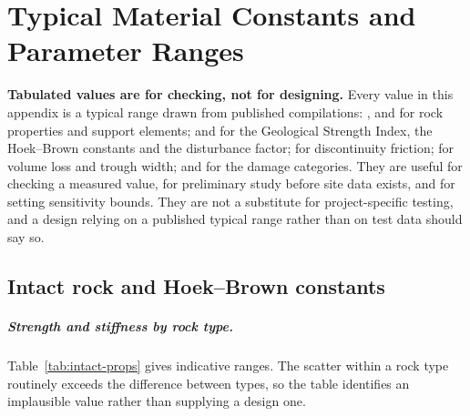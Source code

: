 \chapter{Typical Material Constants and Parameter Ranges}
\label{app:constants}

\noindent\textbf{Tabulated values are for checking, not for designing.}\enspace
Every value in this appendix is a typical range drawn from published
compilations: \citet{hoekbrown1980underground}, \citet{bradybrown2006rock}
and \citet{hoek1995support} for rock properties and support elements;
\citet{marinos2000gsi} and \citet{hoek2002hb} for the Geological Strength
Index, the Hoek--Brown constants and the disturbance factor;
\citet{barton1977shear} for discontinuity friction;
\citet{mair1996settlement} for volume loss and trough width; and
\citet{burland1974settlement} for the damage categories. They are useful for checking a measured value, for
preliminary study before site data exists, and for setting sensitivity bounds.
They are not a substitute for project-specific testing, and a design relying
on a published typical range rather than on test data should say so.

\section{Intact rock and Hoek--Brown constants}
\label{sec:intact-rock-and-hoek-brown-constants}

\paragraph{Strength and stiffness by rock type.}
Table~\ref{tab:intact-props} gives indicative ranges. The scatter within a
rock type routinely exceeds the difference between types, so the table
identifies an implausible value rather than supplying a design one.

